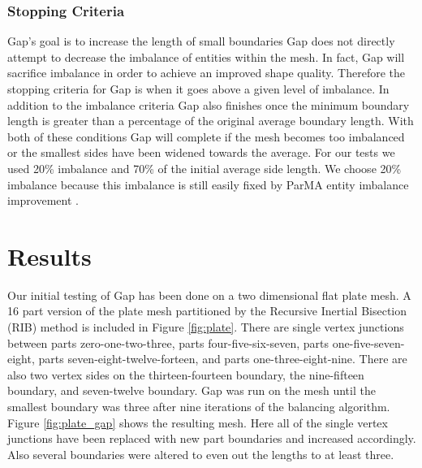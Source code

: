 \documentclass{thesis}
\begin{document}
\subsection{Stopping Criteria}
Gap's goal is to increase the length of small boundaries
Gap does not directly attempt to decrease the imbalance of entities within 
the mesh. In fact, Gap will sacrifice imbalance in order to achieve an improved 
shape quality. Therefore the stopping criteria for Gap is when it goes above a 
given level of imbalance. In addition to the imbalance criteria Gap also 
finishes once the minimum boundary length is greater than a percentage of the 
original average boundary length. With both of these conditions Gap will 
complete if the mesh becomes too imbalanced or the smallest sides have been 
widened towards the average. For our tests we used 20\% imbalance and 70\% 
of the initial average side length. We choose 20\% imbalance because this 
imbalance is still easily fixed by ParMA entity imbalance improvement 
\cite{parma,zhougraph,zhou2012}.

\chapter{Results}

Our initial testing of Gap has been done on a two dimensional flat plate mesh. 
A 16 part version of the plate mesh partitioned by  the Recursive Inertial 
Bisection (RIB) method \cite{williamsRIB,taylorRIB} is included in Figure 
\ref{fig:plate}. There are single vertex junctions between parts 
zero-one-two-three, 
parts four-five-six-seven, parts one-five-seven-eight, parts 
seven-eight-twelve-forteen, and parts one-three-eight-nine. There are 
also two vertex sides on the thirteen-fourteen boundary, the nine-fifteen 
boundary, and seven-twelve 
boundary. Gap was run on the mesh until the smallest boundary was three after 
nine 
iterations of the balancing algorithm. Figure \ref{fig:plate_gap} shows the 
resulting mesh. Here all of the single vertex junctions have been replaced with 
new part boundaries and increased accordingly. Also several boundaries were 
altered to even out the lengths to at least three. 
\end{document}
